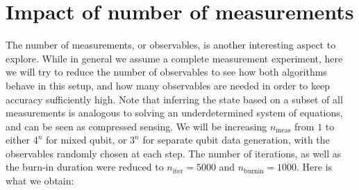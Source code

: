 \documentclass[12pt]{memoir}
\newcommand{\nitern}[1]{$n_{\text{iter}}=#1$}
\newcommand{\nburninn}[1]{$n_{\text{burnin}}=#1$}
\newcommand{\nmeas}[0]{$n_{\text{meas}} $ }
\begin{document}
\section{Impact of number of measurements}\label{section:comp-nb-meas}
The number of measurements, or observables, is another interesting aspect to explore. While in general we assume a complete measurement experiment, here we will try to reduce the number of observables to see how both algorithms behave in this setup, and how many observables are needed in order to keep accuracy sufficiently high. Note that inferring the state based on a subset of all measurements is analogous to solving an underdetermined system of equations, and can be seen as compressed sensing. We will be increasing \nmeas  from $1$ to either $4^n$ for mixed qubit, or $3^n$ for separate qubit data generation, with the observables randomly chosen at each step. The number of iterations, as well as the burn-in duration were reduced to \nitern{5000} and \nburninn{1000}. Here is what we obtain:
\end{document}
